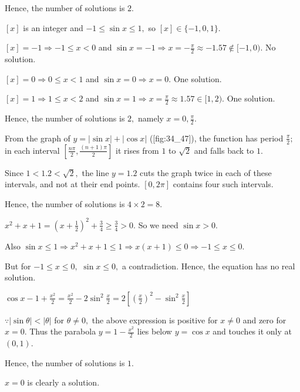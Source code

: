   Hence, the number of solutions is $2.$

\item $[x]$ is an integer and $-1\leq\sin x\leq 1,$ so $[x]\in\{-1, 0, 1\}.$

  $[x] = -1\Rightarrow -1\leq x < 0$ and $\sin x = -1\Rightarrow x = -\frac{\pi}{2}\approx -1.57\notin[-1, 0).$ No
  solution.

  $[x] = 0\Rightarrow 0\leq x < 1$ and $\sin x = 0\Rightarrow x = 0.$ One solution.

  $[x] = 1\Rightarrow 1\leq x < 2$ and $\sin x = 1\Rightarrow x = \frac{\pi}{2}\approx 1.57\in[1, 2).$ One solution.

  Hence, the number of solutions is $2,$ namely $x = 0, \frac{\pi}{2}.$

\item From the graph of $y = |\sin x| + |\cos x|$ ([fig:34_47]), the function has period $\frac{\pi}{2};$ in
  each interval $\left[\frac{n\pi}{2}, \frac{(n + 1)\pi}{2}\right]$ it rises from $1$ to $\sqrt{2}$ and falls back to
  $1.$

  Since $1 < 1.2 < \sqrt{2},$ the line $y = 1.2$ cuts the graph twice in each of these intervals, and not at their end
  points. $[0, 2\pi]$ contains four such intervals.

  Hence, the number of solutions is $4\times 2 = 8.$

\item $x^2 + x + 1 = \left(x + \frac{1}{2}\right)^2 + \frac{3}{4}\geq\frac{3}{4} > 0.$ So we need $\sin x > 0.$

  Also $\sin x\leq 1 \Rightarrow x^2 + x + 1\leq 1 \Rightarrow x(x + 1)\leq 0 \Rightarrow -1\leq x\leq 0.$

  But for $-1\leq x\leq 0,$ $\sin x\leq 0,$ a contradiction. Hence, the equation has no real solution.

\item $\cos x - 1 + \frac{x^2}{2} = \frac{x^2}{2} - 2\sin^2\frac{x}{2} = 2\left[\left(\frac{x}{2}\right)^2 -
  \sin^2\frac{x}{2}\right]$

  $\because |\sin\theta| < |\theta|$ for $\theta\neq 0,$ the above expression is positive for $x\neq 0$ and zero for $x
  = 0.$ Thus the parabola $y = 1 - \frac{x^2}{2}$ lies below $y = \cos x$ and touches it only at $(0, 1).$

  Hence, the number of solutions is $1.$

\item $x = 0$ is clearly a solution.

